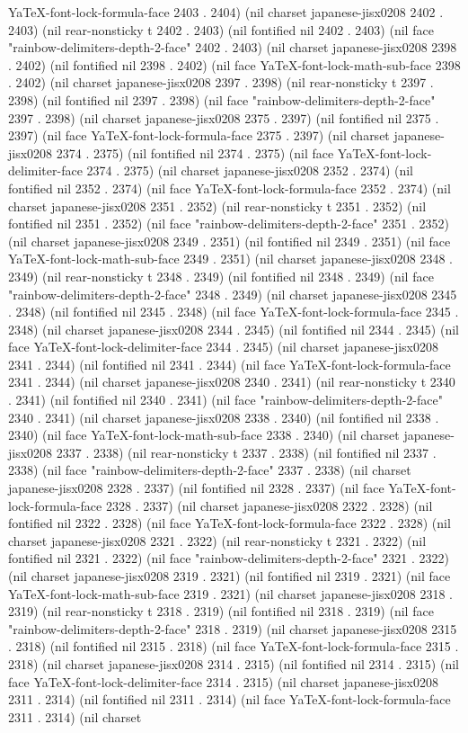 YaTeX-font-lock-formula-face 2403 . 2404) (nil charset japanese-jisx0208 2402 . 2403) (nil rear-nonsticky t 2402 . 2403) (nil fontified nil 2402 . 2403) (nil face "rainbow-delimiters-depth-2-face" 2402 . 2403) (nil charset japanese-jisx0208 2398 . 2402) (nil fontified nil 2398 . 2402) (nil face YaTeX-font-lock-math-sub-face 2398 . 2402) (nil charset japanese-jisx0208 2397 . 2398) (nil rear-nonsticky t 2397 . 2398) (nil fontified nil 2397 . 2398) (nil face "rainbow-delimiters-depth-2-face" 2397 . 2398) (nil charset japanese-jisx0208 2375 . 2397) (nil fontified nil 2375 . 2397) (nil face YaTeX-font-lock-formula-face 2375 . 2397) (nil charset japanese-jisx0208 2374 . 2375) (nil fontified nil 2374 . 2375) (nil face YaTeX-font-lock-delimiter-face 2374 . 2375) (nil charset japanese-jisx0208 2352 . 2374) (nil fontified nil 2352 . 2374) (nil face YaTeX-font-lock-formula-face 2352 . 2374) (nil charset japanese-jisx0208 2351 . 2352) (nil rear-nonsticky t 2351 . 2352) (nil fontified nil 2351 . 2352) (nil face "rainbow-delimiters-depth-2-face" 2351 . 2352) (nil charset japanese-jisx0208 2349 . 2351) (nil fontified nil 2349 . 2351) (nil face YaTeX-font-lock-math-sub-face 2349 . 2351) (nil charset japanese-jisx0208 2348 . 2349) (nil rear-nonsticky t 2348 . 2349) (nil fontified nil 2348 . 2349) (nil face "rainbow-delimiters-depth-2-face" 2348 . 2349) (nil charset japanese-jisx0208 2345 . 2348) (nil fontified nil 2345 . 2348) (nil face YaTeX-font-lock-formula-face 2345 . 2348) (nil charset japanese-jisx0208 2344 . 2345) (nil fontified nil 2344 . 2345) (nil face YaTeX-font-lock-delimiter-face 2344 . 2345) (nil charset japanese-jisx0208 2341 . 2344) (nil fontified nil 2341 . 2344) (nil face YaTeX-font-lock-formula-face 2341 . 2344) (nil charset japanese-jisx0208 2340 . 2341) (nil rear-nonsticky t 2340 . 2341) (nil fontified nil 2340 . 2341) (nil face "rainbow-delimiters-depth-2-face" 2340 . 2341) (nil charset japanese-jisx0208 2338 . 2340) (nil fontified nil 2338 . 2340) (nil face YaTeX-font-lock-math-sub-face 2338 . 2340) (nil charset japanese-jisx0208 2337 . 2338) (nil rear-nonsticky t 2337 . 2338) (nil fontified nil 2337 . 2338) (nil face "rainbow-delimiters-depth-2-face" 2337 . 2338) (nil charset japanese-jisx0208 2328 . 2337) (nil fontified nil 2328 . 2337) (nil face YaTeX-font-lock-formula-face 2328 . 2337) (nil charset japanese-jisx0208 2322 . 2328) (nil fontified nil 2322 . 2328) (nil face YaTeX-font-lock-formula-face 2322 . 2328) (nil charset japanese-jisx0208 2321 . 2322) (nil rear-nonsticky t 2321 . 2322) (nil fontified nil 2321 . 2322) (nil face "rainbow-delimiters-depth-2-face" 2321 . 2322) (nil charset japanese-jisx0208 2319 . 2321) (nil fontified nil 2319 . 2321) (nil face YaTeX-font-lock-math-sub-face 2319 . 2321) (nil charset japanese-jisx0208 2318 . 2319) (nil rear-nonsticky t 2318 . 2319) (nil fontified nil 2318 . 2319) (nil face "rainbow-delimiters-depth-2-face" 2318 . 2319) (nil charset japanese-jisx0208 2315 . 2318) (nil fontified nil 2315 . 2318) (nil face YaTeX-font-lock-formula-face 2315 . 2318) (nil charset japanese-jisx0208 2314 . 2315) (nil fontified nil 2314 . 2315) (nil face YaTeX-font-lock-delimiter-face 2314 . 2315) (nil charset japanese-jisx0208 2311 . 2314) (nil fontified nil 2311 . 2314) (nil face YaTeX-font-lock-formula-face 2311 . 2314) (nil charset 